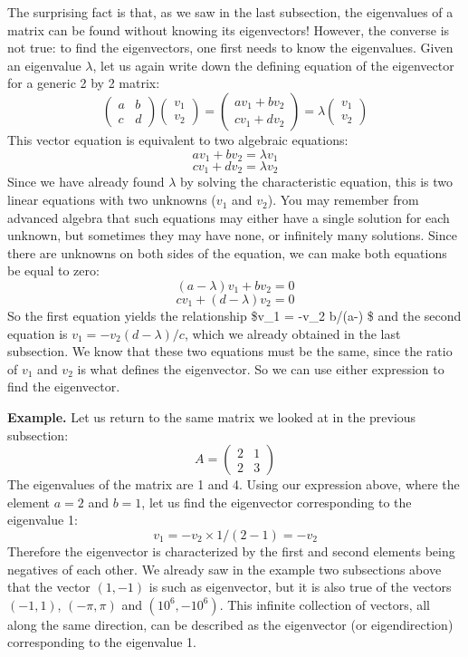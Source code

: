\documentclass[
]{book}
\theoremstyle{definition}
\theoremstyle{definition}
\theoremstyle{definition}
\theoremstyle{remark}
\begin{document}
The surprising fact is that, as we saw in the last subsection, the eigenvalues of a matrix can be found without knowing its eigenvectors! However, the converse is not true: to find the eigenvectors, one first needs to know the eigenvalues. Given an eigenvalue \(\lambda\), let us again write down the defining equation of the eigenvector for a generic 2 by 2 matrix:
\[  \left(\begin{array}{cc}a & b \\c & d\end{array}\right)\left(\begin{array}{c}v_1 \\ v_2 \end{array}\right) = \left(\begin{array}{c}av_1 +b v_2\\ cv_1+ dv_2 \end{array}\right) = \lambda \left(\begin{array}{c}v_1 \\ v_2 \end{array}\right)  \]
This vector equation is equivalent to two algebraic equations:
\[
av_1 + b v_2 = \lambda v_1
\]
\[
cv_1 + d v_2 = \lambda v_2 
\]
Since we have already found \(\lambda\) by solving the characteristic equation, this is two linear equations with two unknowns (\(v_1\) and \(v_2\)). You may remember from advanced algebra that such equations may either have a single solution for each unknown, but sometimes they may have none, or infinitely many solutions. Since there are unknowns on both sides of the equation, we can make both equations be equal to zero:
\[
(a-\lambda)v_1 + b v_2 = 0
\]
\[
cv_1 + (d-\lambda ) v_2 =0
\]
So the first equation yields the relationship \$v\_1 = -v\_2 b/(a-\lambda) \$ and the second equation is \(v_1 = -v_2(d-\lambda)/c\), which we already obtained in the last subsection. We know that these two equations must be the same, since the ratio of \(v_1\) and \(v_2\) is what defines the eigenvector. So we can use either expression to find the eigenvector.

\textbf{Example.} Let us return to the same matrix we looked at in the previous subsection:
\[ 
A = \left(\begin{array}{cc}2 & 1 \\ 2& 3\end{array}\right)
\]
The eigenvalues of the matrix are 1 and 4. Using our expression above, where the element \(a=2\) and \(b=1\), let us find the eigenvector corresponding to the eigenvalue 1:
\[ 
v_1 = - v_2 \times  1/(2-1) = - v_2
\]
Therefore the eigenvector is characterized by the first and second elements being negatives of each other. We already saw in the example two subsections above that the vector \((1,-1)\) is such as eigenvector, but it is also true of the vectors \((-1,1)\), \((-\pi, \pi)\) and \((10^6, -10^6)\). This infinite collection of vectors, all along the same direction, can be described as the eigenvector (or eigendirection) corresponding to the eigenvalue 1.
\end{document}
